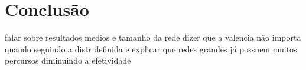 \chapter{Conclusão}
falar sobre resultados medios e tamanho da rede dizer que a valencia não importa quando seguindo a distr definida e explicar que redes grandes já possuem muitos percursos diminuindo a efetividade


